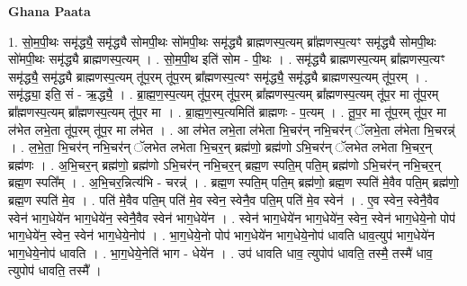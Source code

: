 \documentclass[17pt]{extarticle}
\begin{document}
\textbf{Ghana Paata } \newline

1. सो॒म॒पी॒थः समृ॑द्ध्यै॒ समृ॑द्ध्यै सोमपी॒थः सो॑मपी॒थः समृ॑द्ध्यै ब्राह्मणस्प॒त्यम् ब्रा᳚ह्मणस्प॒त्यꣳ समृ॑द्ध्यै सोमपी॒थः सो॑मपी॒थः समृ॑द्ध्यै ब्राह्मणस्प॒त्यम् । . सो॒म॒पी॒थ इति॑ सोम - पी॒थः । . समृ॑द्ध्यै ब्राह्मणस्प॒त्यम् ब्रा᳚ह्मणस्प॒त्यꣳ समृ॑द्ध्यै॒ समृ॑द्ध्यै ब्राह्मणस्प॒त्यम् तू॑प॒रम् तू॑प॒रम् ब्रा᳚ह्मणस्प॒त्यꣳ समृ॑द्ध्यै॒ समृ॑द्ध्यै ब्राह्मणस्प॒त्यम् तू॑प॒रम् । . समृ॑द्ध्या॒ इति॒ सं - ऋ॒द्ध्यै॒ । . ब्रा॒ह्म॒ण॒स्प॒त्यम् तू॑प॒रम् तू॑प॒रम् ब्रा᳚ह्मणस्प॒त्यम् ब्रा᳚ह्मणस्प॒त्यम् तू॑प॒र मा तू॑प॒रम् ब्रा᳚ह्मणस्प॒त्यम् ब्रा᳚ह्मणस्प॒त्यम् तू॑प॒र मा । . ब्रा॒ह्म॒ण॒स्प॒त्यमिति॑ ब्राह्मणः - प॒त्यम् । . तू॒प॒र मा तू॑प॒रम् तू॑प॒र मा ल॑भेत लभे॒ता तू॑प॒रम् तू॑प॒र मा ल॑भेत । . आ ल॑भेत लभे॒ता ल॑भेता भि॒चर॑न् नभि॒चर॑न् ॅलभे॒ता ल॑भेता भि॒चरन्न्॑ । . ल॒भे॒ता॒ भि॒चर॑न् नभि॒चर॑न् ॅलभेत लभेता भि॒चर॒न् ब्रह्म॑णो॒ ब्रह्म॑णो ऽभि॒चर॑न् ॅलभेत लभेता भि॒चर॒न् ब्रह्म॑णः । . अ॒भि॒चर॒न् ब्रह्म॑णो॒ ब्रह्म॑णो ऽभि॒चर॑न् नभि॒चर॒न् ब्रह्म॒ण स्पति॒म् पति॒म् ब्रह्म॑णो ऽभि॒चर॑न् नभि॒चर॒न् ब्रह्म॒ण स्पति᳚म् । . अ॒भि॒चर॒न्नित्य॑भि - चरन्न्॑ । . ब्रह्म॒ण स्पति॒म् पति॒म् ब्रह्म॑णो॒ ब्रह्म॒ण स्पति॑ मे॒वैव पति॒म् ब्रह्म॑णो॒ ब्रह्म॒ण स्पति॑ मे॒व । . पति॑ मे॒वैव पति॒म् पति॑ मे॒व स्वेन॒ स्वेनै॒व पति॒म् पति॑ मे॒व स्वेन॑ । . ए॒व स्वेन॒ स्वेनै॒वैव स्वेन॑ भाग॒धेये॑न भाग॒धेये॑न॒ स्वेनै॒वैव स्वेन॑ भाग॒धेये॑न । . स्वेन॑ भाग॒धेये॑न भाग॒धेये॑न॒ स्वेन॒ स्वेन॑ भाग॒धेये॒नो पोप॑ भाग॒धेये॑न॒ स्वेन॒ स्वेन॑ भाग॒धेये॒नोप॑ । . भा॒ग॒धेये॒नो पोप॑ भाग॒धेये॑न भाग॒धेये॒नोप॑ धावति धाव॒त्युप॑ भाग॒धेये॑न भाग॒धेये॒नोप॑ धावति । . भा॒ग॒धेये॒नेति॑ भाग - धेये॑न । . उप॑ धावति धाव॒ त्युपोप॑ धावति॒ तस्मै॒ तस्मै॑ धाव॒ त्युपोप॑ धावति॒ तस्मै᳚ । \newline
\end{document}
